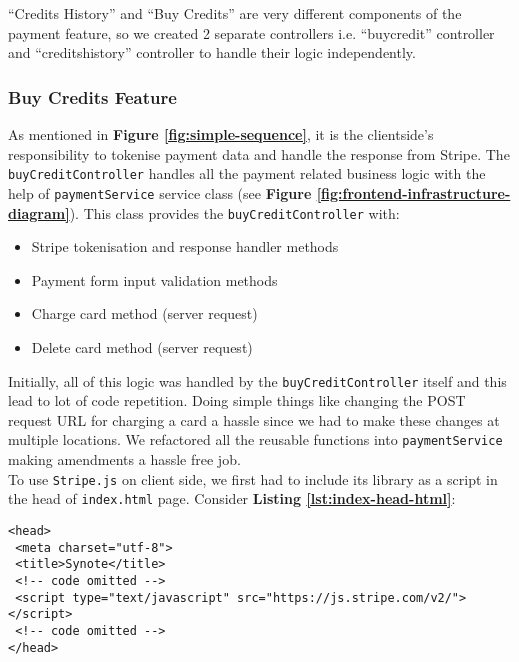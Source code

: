 “Credits History” and “Buy Credits” are very different components of the payment feature, so we created 2 separate controllers i.e. “buycredit” controller and “creditshistory” controller to handle their logic independently.

\subsubsection{Buy Credits Feature}
\label{subsubsec:buy-credits-feature}

As mentioned in \textbf{Figure \ref{fig:simple-sequence}}, it is the clientside’s responsibility to tokenise payment data and handle the response from Stripe. The \texttt{buyCreditController} handles all the payment related business logic with the help of \texttt{paymentService} service class (see \textbf{Figure \ref{fig:frontend-infrastructure-diagram}}). This class provides the \texttt{buyCreditController} with:

\begin{itemize}
\item Stripe tokenisation and response handler methods
\item Payment form input validation methods
\item Charge card method (server request)
\item Delete card method (server request)
\end{itemize}

Initially, all of this logic was handled by the \texttt{buyCreditController} itself and this lead to lot of code repetition. Doing simple things like changing the POST request URL for charging a card a hassle since we had to make these changes at multiple locations. We refactored all the reusable functions into \texttt{paymentService} making amendments a hassle free job. \\

To use \texttt{Stripe.js} on client side, we first had to include its library as a script in the head of \texttt{index.html} page. Consider \textbf{Listing \ref{lst:index-head-html}}:\\

\begin{listing}[H]
\begin{verbatim}
<head>
 <meta charset="utf-8">
 <title>Synote</title>
 <!-- code omitted -->
 <script type="text/javascript" src="https://js.stripe.com/v2/"></script>
 <!-- code omitted -->
</head>
\end{verbatim}
\label{lst:index-head-html}
\end{listing}

